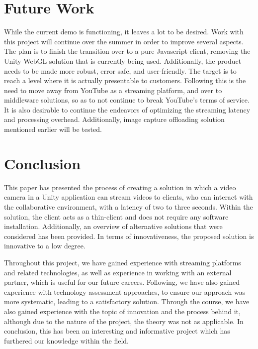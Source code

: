 \section{Future Work}
While the current demo is functioning, it leaves a lot to be desired. Work with this project will continue over the summer in order to improve several aspects. The plan is to finish the transition over to a pure Javascript client, removing the Unity WebGL solution that is currently being used. Additionally, the product needs to be made more robust, error safe, and user-friendly. The target is to reach a level where it is actually presentable to customers.
Following this is the need to move away from YouTube as a streaming platform, and over to middleware solutions, so as to not continue to break YouTube's terms of service.
It is also desirable to continue the endeavors of optimizing the streaming latency and processing overhead. Additionally, image capture offloading solution mentioned earlier will be tested.

\section{Conclusion}
This paper has presented the process of creating a solution in which a video camera in a Unity application can stream videos to clients, who can interact with the collaborative environment, with a latency of two to three seconds. Within the solution, the client acts as a thin-client and does not require any software installation. Additionally, an overview of alternative solutions that were considered has been provided. In terms of innovativeness, the proposed solution is innovative to a low degree.

Throughout this project, we have gained experience with streaming platforms and related technologies, as well as experience in working with an external partner, which is useful for our future careers. Following, we have also gained experience with technology assessment approaches, to ensure our approach was more systematic, leading to a satisfactory solution. Through the course, we have also gained experience with the topic of innovation and the process behind it, although due to the nature of the project, the theory was not as applicable.
In conclusion, this has been an interesting and informative project which has furthered our knowledge within the field.
